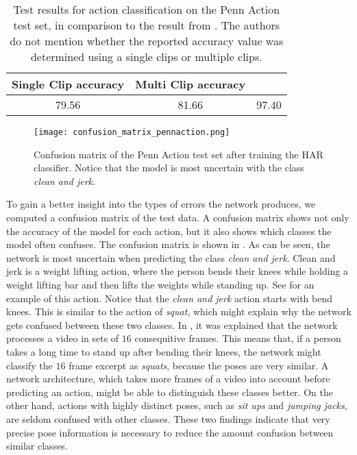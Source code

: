 \begin{table}[]
    \small
    \centering
    \begin{tabular}{|c|c|c|}
    \hline
        \textbf{Single Clip accuracy} & \textbf{Multi Clip accuracy} & \cite{luvizon_2d/3d_2018}\\ \hline
        79.56 & 81.66 & 97.40 \\ \hline
    \end{tabular}
    \caption{Test results for action classification on the Penn Action test set, in comparison to the result from \cite{luvizon_2d/3d_2018}. The authors do not mention whether the reported accuracy value was determined using a single clips or multiple clips.}
    \label{tab:pennaction_test_results}
\end{table}

\begin{figure}[htb!]
    \centering
    \texttt{[image: confusion\_matrix\_pennaction.png]}
    \caption{Confusion matrix of the Penn Action test set after training the HAR classifier. Notice that the model is most uncertain with the class \textit{clean and jerk}.}
    \label{fig:cm-pennaction}
\end{figure}

To gain a better insight into the types of errors the network produces, we computed a confusion matrix of the test data.
A confusion matrix shows not only the accuracy of the model for each action, but it also shows which classes the model often confuses.
The confusion matrix is shown in . 
As can be seen, the network is most uncertain when predicting the class \textit{clean and jerk}.
Clean and jerk is a weight lifting action, where the person bends their knees while holding a weight lifting bar and then lifts the weights while standing up.
See  for an example of this action.
Notice that the \textit{clean and jerk} action starts with bend knees.
This is similar to the action of \textit{squat}, which might explain why the network gets confused between these two classes.
In , it was explained that the network processes a video in sets of $16$ consequitive frames.
This means that, if a person takes a long time to stand up after bending their knees, the network might classify the $16$ frame excerpt as \textit{squats}, because the poses are very similar.
A network architecture, which takes more frames of a video into account before predicting an action, might be able to distinguish these classes better.
On the other hand, actions with highly distinct poses, such as \textit{sit ups} and \textit{jumping jacks}, are seldom confused with other classes.
These two findings indicate that very precise pose information is necessary to reduce the amount confusion between similar classes. 

